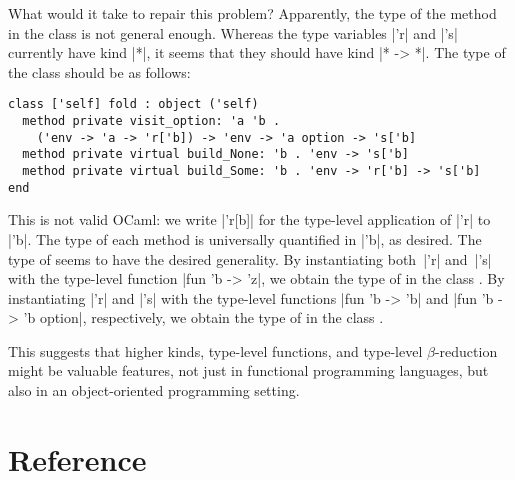 \documentclass[11pt,a4paper,twoside]{article}
\begin{document}
What would it take to repair this problem? Apparently, the type of the method
 in the class \fold is not general enough. Whereas the
type variables \oc|'r| and \oc|'s| currently have kind \oc|*|, it seems that
they should have kind \oc|* -> *|. The type of the class \fold should be as
follows:
%
\begin{mdframed}[backgroundcolor=green!10]
\begin{lstlisting}
class ['self] fold : object ('self)
  method private visit_option: 'a 'b .
    ('env -> 'a -> 'r['b]) -> 'env -> 'a option -> 's['b]
  method private virtual build_None: 'b . 'env -> 's['b]
  method private virtual build_Some: 'b . 'env -> 'r['b] -> 's['b]
end
\end{lstlisting}
\end{mdframed}

This is not valid OCaml: we write \oc|'r[b]| for the type-level application of
\oc|'r| to \oc|'b|. The type of each method is universally quantified in
\oc|'b|, as desired. The type of  seems to have the
desired generality. By instantiating both~\oc|'r| and~\oc|'s| with the
type-level function \oc|fun 'b -> 'z|, we obtain the type of
 in the class \reduce. By instantiating \oc|'r| and
\oc|'s| with the type-level functions
%
\oc|fun 'b -> 'b| and \oc|fun 'b -> 'b option|, respectively, we obtain the
type of  in the class \map.

This suggests that higher kinds, type-level functions, and type-level
$\beta$-reduction might be valuable features, not just in functional
programming languages, but also in an object-oriented programming setting.


\section{Reference}

\end{document}
